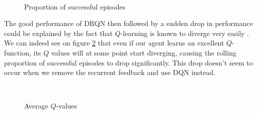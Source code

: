 \documentclass[letterpaper]{article}
\begin{document}
\begin{figure}
	\\
	\caption{Proportion of successful episodes}
	\label{successrate}
\end{figure}

The good performance of DRQN then followed by a sudden drop in performance could
be explained by the fact that $Q$-learning is known to diverge very easily 
. We can indeed see on figure \ref{averageq} that
even if our agent learns an excellent $Q$-function, its $Q$ values will at some
point start diverging, causing the rolling proportion of successful episodes
to drop significantly. This drop doesn't seem to occur when we remove the
recurrent feedback and use DQN instead.\\

\begin{figure}
	\\
	\caption{Average $Q$-values}
	\label{averageq}
\end{figure}
\end{document}
